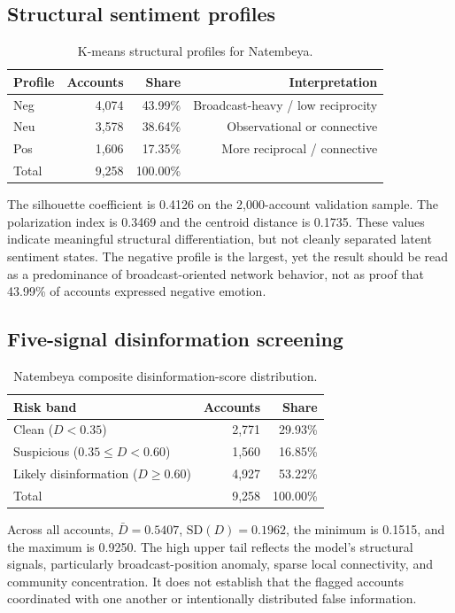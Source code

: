 \documentclass[11pt]{article}
\begin{document}
\subsection{Structural sentiment profiles}
\begin{table}[h]
\centering
\caption{K-means structural profiles for Natembeya.}
\begin{tabular}{lrrr}
\toprule
Profile & Accounts & Share & Interpretation\\
\midrule
Neg & 4,074 & 43.99\% & Broadcast-heavy / low reciprocity\\
Neu & 3,578 & 38.64\% & Observational or connective\\
Pos & 1,606 & 17.35\% & More reciprocal / connective\\
\midrule
Total & 9,258 & 100.00\% & \\
\bottomrule
\end{tabular}
\end{table}

The silhouette coefficient is 0.4126 on the 2,000-account validation sample. The polarization index is 0.3469 and the centroid distance is 0.1735. These values indicate meaningful structural differentiation, but not cleanly separated latent sentiment states. The negative profile is the largest, yet the result should be read as a predominance of broadcast-oriented network behavior, not as proof that 43.99\% of accounts expressed negative emotion.

\subsection{Five-signal disinformation screening}
\begin{table}[h]
\centering
\caption{Natembeya composite disinformation-score distribution.}
\begin{tabular}{lrr}
\toprule
Risk band & Accounts & Share\\
\midrule
Clean ($D<0.35$) & 2,771 & 29.93\%\\
Suspicious ($0.35\le D<0.60$) & 1,560 & 16.85\%\\
Likely disinformation ($D\ge0.60$) & 4,927 & 53.22\%\\
\midrule
Total & 9,258 & 100.00\%\\
\bottomrule
\end{tabular}
\end{table}

Across all accounts, $\bar{D}=0.5407$, $\mathrm{SD}(D)=0.1962$, the minimum is 0.1515, and the maximum is 0.9250. The high upper tail reflects the model's structural signals, particularly broadcast-position anomaly, sparse local connectivity, and community concentration. It does not establish that the flagged accounts coordinated with one another or intentionally distributed false information.
\end{document}
